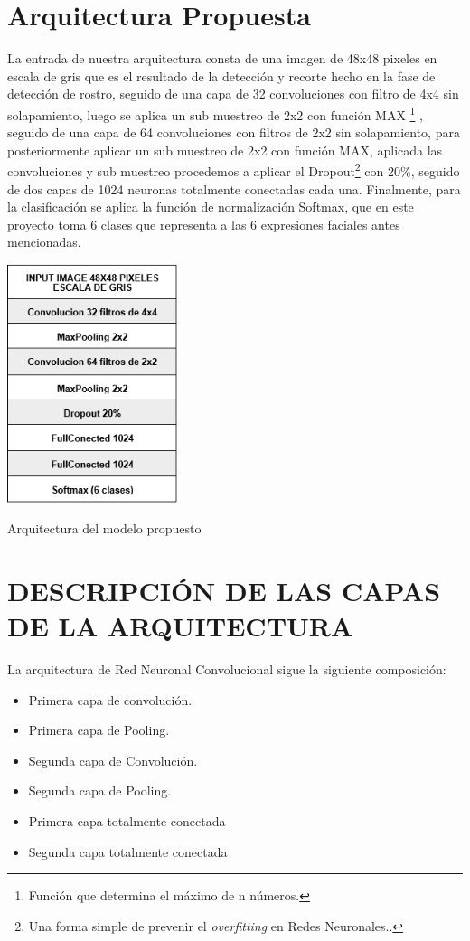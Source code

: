 \section{Arquitectura Propuesta}
La entrada de nuestra arquitectura consta de una imagen de 48x48 pixeles en
escala de gris que es el resultado de la detección y recorte hecho en la fase de detección
de rostro, seguido de una capa de 32 convoluciones con filtro de 4x4 sin solapamiento,
luego se aplica un sub muestreo de 2x2 con función MAX \footnote[6]{Función que determina el máximo de n números.} , seguido de una capa de 64
convoluciones con filtros de 2x2 sin solapamiento, para posteriormente aplicar un sub
muestreo de 2x2 con función MAX, aplicada las convoluciones y sub muestreo
procedemos a aplicar el Dropout\footnote[7]{Una forma simple de prevenir el \textit{overfitting} en Redes Neuronales..} con 20\%, seguido de dos capas de 1024 neuronas
totalmente conectadas cada una. Finalmente, para la clasificación se aplica la función de
normalización Softmax, que en este proyecto toma 6 clases que representa a las 6
expresiones faciales antes mencionadas.
\vspace{0.5cm}
\begin{table}[H]
    \centering
    \includegraphics[width=50mm]{./Imagenes/tabla_arquitectura.png}
    \caption{Arquitectura del modelo propuesto}
    \label{tab:tabla_arquitectura}
\end{table}

\section{DESCRIPCIÓN DE LAS CAPAS DE LA ARQUITECTURA}
La arquitectura de Red Neuronal Convolucional sigue la siguiente composición:
\begin{itemize}
\item Primera capa de convolución.
\item Primera capa de Pooling.
\item Segunda capa de Convolución.
\item Segunda capa de Pooling.
\item Primera capa totalmente conectada
\item Segunda capa totalmente conectada
\end{itemize}

